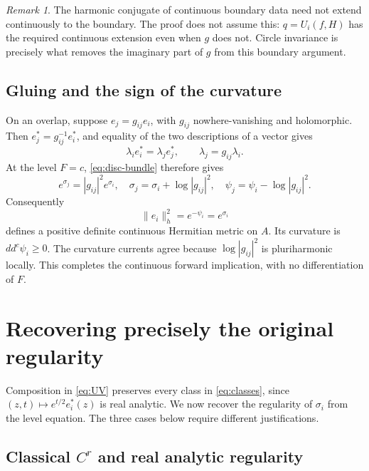 \documentclass[11pt]{amsart}
\theoremstyle{definition}
\theoremstyle{remark}
\newtheorem{remark}[theorem]{Remark}
\numberwithin{equation}{section}
\newcommand{\ddc}{dd^c}
\begin{document}
\begin{remark}\label{rem:conjugate}
The harmonic conjugate of continuous boundary data need not extend
continuously to the boundary. The proof does not assume this:
$q=U_i(f,H)$ has the required continuous extension even when $g$
does not. Circle invariance is precisely what removes the imaginary
part of $g$ from this boundary argument.
\end{remark}

\subsection{Gluing and the sign of the curvature}

On an overlap, suppose $e_j=g_{ij}e_i$, with $g_{ij}$ nowhere-vanishing
and holomorphic. Then $e_j^*=g_{ij}^{-1}e_i^*$, and equality of the
two descriptions of a vector gives
\[
\lambda_i e_i^*=\lambda_j e_j^*,\qquad
\lambda_j=g_{ij}\lambda_i.
\]
At the level $F=c$, \eqref{eq:disc-bundle} therefore gives
\begin{equation}\label{eq:transition}
e^{\sigma_j}=|g_{ij}|^2e^{\sigma_i},\quad
\sigma_j=\sigma_i+\log|g_{ij}|^2,\quad
\psi_j=\psi_i-\log|g_{ij}|^2.
\end{equation}
Consequently
\begin{equation}\label{eq:constructed-metric}
\|e_i\|_h^2=e^{-\psi_i}=e^{\sigma_i}
\end{equation}
defines a positive definite continuous Hermitian metric on $A$.
Its curvature is $\ddc\psi_i\ge0$. The curvature currents agree
because $\log|g_{ij}|^2$ is pluriharmonic locally. This completes the
continuous forward implication, with no differentiation of $F$.

\section{Recovering precisely the original regularity}

Composition in \eqref{eq:UV} preserves every class in
\eqref{eq:classes}, since $(z,t)\mapsto e^{t/2}e_i^*(z)$ is real
analytic. We now recover the regularity of $\sigma_i$ from the
level equation. The three cases below require different justifications.

\subsection{Classical \texorpdfstring{$C^r$}{C-r} and real analytic regularity}
\end{document}
